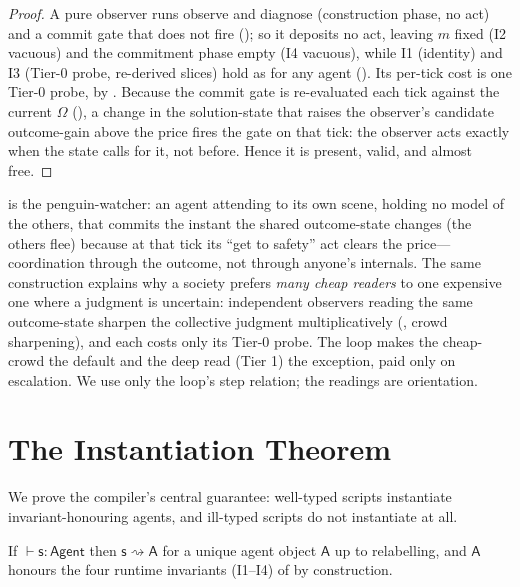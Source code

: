 \documentclass[11pt,twocolumn,a4paper]{article}
\newcommand{\Agent}{\mathsf{A}}
\newcommand{\spec}{\mathsf{s}}         %
\newcommand{\judge}{\vdash}
\newcommand{\lowers}{\rightsquigarrow} %
\begin{document}
\begin{proof}
A pure observer runs observe and diagnose (construction phase, no act) and a
commit gate that does not fire (); so it deposits no act,
leaving $m$ fixed (I2 vacuous) and the commitment phase empty (I4 vacuous),
while I1 (identity) and I3 (Tier-0 probe, re-derived slices) hold as for any
agent (). Its per-tick cost is one Tier-0 probe, by
. Because the commit gate is re-evaluated each tick against
the current $\Omega$ (), a change in the solution-state
that raises the observer's candidate outcome-gain above the price fires the
gate on that tick: the observer acts exactly when the state calls for it, not
before. Hence it is present, valid, and almost free.
\end{proof}

\begin{remark}
\label{rem:zoo}
 is the penguin-watcher: an agent attending to its own
scene, holding no model of the others, that commits the instant the shared
outcome-state changes (the others flee) because at that tick its
``get to safety'' act clears the price---coordination through the outcome, not
through anyone's internals. The same construction explains why a society
prefers \emph{many cheap readers} to one expensive one where a judgment is
uncertain: independent observers reading the same outcome-state sharpen the
collective judgment multiplicatively (, crowd sharpening),
and each costs only its Tier-0 probe. The loop makes the cheap-crowd the
default and the deep read (Tier 1) the exception, paid only on escalation. We
use only the loop's step relation; the readings are orientation.
\end{remark}

\section{The Instantiation Theorem}
\label{sec:soundness}

We prove the compiler's central guarantee: well-typed scripts instantiate
invariant-honouring agents, and ill-typed scripts do not instantiate at all.

\begin{theorem}
\label{thm:instantiation}
If $\judge\spec:\mathsf{Agent}$ then $\spec\lowers\Agent$ for a unique agent
object $\Agent$ up to relabelling, and $\Agent$ honours the four runtime
invariants \textup{(I1--I4)} of  by construction.
\end{theorem}
\end{document}
